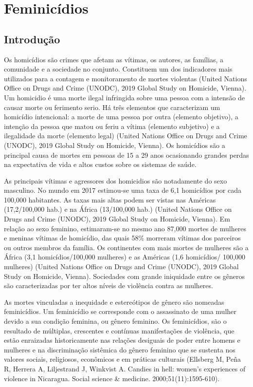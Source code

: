 \chapter{Feminicídios}

\section{Introdução}

Os homicídios são crimes que afetam as vítimas, os autores, as famílias, a comunidade e a sociedade no conjunto. Constituem um dos indicadores mais utilizados para a contagem e monitoramento de mortes violentas (United Nations Office on Drugs and Crime (UNODC), 2019 Global Study on Homicide, Vienna). Um homicidio é uma morte ilegal infringida sobre uma pessoa com a intensão de causar morte ou ferimento serio. Há três elementos que caracterizam um homicídio intencional: a morte de uma pessoa por outra (elemento objetivo), a intenção da pessoa que matou ou feriu a vítima (elemento subjetivo) e a ilegalidade da morte (elemento legal) (United Nations Office on Drugs and Crime (UNODC), 2019 Global Study on Homicide, Vienna). Os homicídios são a principal causa de mortes em pessoas de 15 a 29 anos ocasionando grandes perdas na expectativa de vida e altos custos sobre os sistemas de saúde. 

As principais vítimas e agressores dos homicidios são notadamente do sexo masculino. No mundo em 2017 estimou-se uma taxa de 6,1 homicídios por cada 100,000 habitantes. As taxas mais altas podem ser vistas nas Américas (17,2/100,000 hab.) e na África (13/100,000 hab.) (United Nations Office on Drugs and Crime (UNODC), 2019 Global Study on Homicide, Vienna). Em relação ao sexo feminino, estimaram-se no mesmo ano 87,000 mortes de mulheres e meninas vítimas de homicídio, das quais 58\% morreram vítimas dos parceiros ou outros membros da família. Os continentes com mais mortes de mulheres são a África (3,1 homicídios/100,000 mulheres) e as Américas (1,6 homicídios/ 100,000 mulheres) (United Nations Office on Drugs and Crime (UNODC), 2019 Global Study on Homicide, Vienna). Sociedades com grande iniquidade entre os  gêneros são caracterizadas por ter altos níveis de violência contra as mulheres.

As mortes vinculadas a inequidade e estereótipos de gênero são nomeadas feminicídios. Um feminicídio se corresponde com o assassinato de uma mulher devido a sua condição feminina, ou gênero feminino. Os feminicídios, são o resultado de múltiplas, crescentes e contínuas manifestações de violência, que estão enraizadas historicamente nas relações desiguais de poder entre homens e mulheres e na discriminação sistêmica do gênero feminino que se sustenta nos valores sociais, religiosos, econômicos e em práticas culturais (Ellsberg M, Peña R, Herrera A, Liljestrand J, Winkvist A. Candies in hell: women’s experiences of violence in Nicaragua. Social science & medicine. 2000;51(11):1595-610). 

